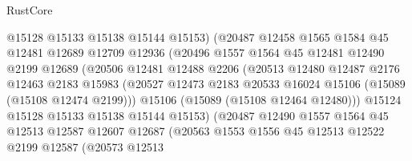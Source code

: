 \begin{lexlean}{RustCore}
\begin{coremodule}
                            @15128
                            @15133
                            @15138
                            @15144
                            @15153)
                          (@20487
                            @12458
                            @1565
                            @1584
                            @45
                            @12481
                            @12689
                            @12709
                            @12936
                            (@20496
                              @1557
                              @1564
                              @45
                              @12481
                              @12490
                              @2199
                              @12689
                              (@20506
                                @12481
                                @12488
                                @2206
                                (@20513
                                  @12480
                                  @12487
                                  @2176
                                  @12463
                                  @2183
                                  @15983
                                  (@20527
                                    @12473
                                    @2183
                                    @20533
                                    @16024
                                    @15106
                                    (@15089 (@15108 @12474 @2199)))
                                  @15106
                                  (@15089 (@15108 @12464 @12480)))
                                @15124
                                @15128
                                @15133
                                @15138
                                @15144
                                @15153)
                              (@20487
                                @12490
                                @1557
                                @1564
                                @45
                                @12513
                                @12587
                                @12607
                                @12687
                                (@20563
                                  @1553
                                  @1556
                                  @45
                                  @12513
                                  @12522
                                  @2199
                                  @12587
                                  (@20573
                                    @12513

\end{coremodule}
\end{lexlean}
